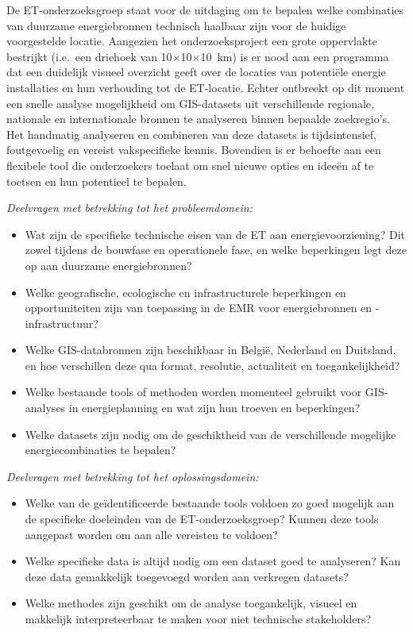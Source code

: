 De ET-onderzoeksgroep staat voor de uitdaging om te bepalen welke combinaties van duurzame energiebronnen technisch haalbaar zijn voor de huidige voorgestelde locatie. Aangezien het onderzoeksproject een grote oppervlakte bestrijkt (i.e.\ een driehoek van 10$\times$10$\times$10~km) is er nood aan een programma dat een duidelijk visueel overzicht geeft over de locaties van potentiële energie installaties en hun verhouding tot de ET-locatie. Echter ontbreekt op dit moment een snelle analyse mogelijkheid om GIS-datasets uit verschillende regionale, nationale en internationale bronnen te analyseren binnen bepaalde zoekregio's. Het handmatig analyseren en combineren van deze datasets is tijdsintensief, foutgevoelig en vereist vakspecifieke kennis. Bovendien is er behoefte aan een flexibele tool die onderzoekers toelaat om snel nieuwe opties en ideeën af te toetsen en hun potentieel te bepalen.\medskip

\textit{Deelvragen met betrekking tot het probleemdomein:}
\begin{itemize}
    \item Wat zijn de specifieke technische eisen van de ET aan energievoorziening? Dit zowel tijdens de bouwfase en operationele fase, en welke beperkingen legt deze op aan duurzame energiebronnen?
    \item Welke geografische, ecologische en infrastructurele beperkingen en opportuniteiten zijn van toepassing in de EMR voor energiebronnen en -infrastructuur?
    \item Welke GIS-databronnen zijn beschikbaar in België, Nederland en Duitsland, en hoe verschillen deze qua format, resolutie, actualiteit en toegankelijkheid?
    \item Welke bestaande tools of methoden worden momenteel gebruikt voor GIS-analyses in energieplanning en wat zijn hun troeven en beperkingen?
    \item Welke datasets zijn nodig om de geschiktheid van de verschillende mogelijke energiecombinaties te bepalen?
\end{itemize}

\textit{Deelvragen met betrekking tot het oplossingsdomein:}
\begin{itemize}
    \item Welke van de geïdentificeerde bestaande tools voldoen zo goed mogelijk aan de specifieke doeleinden van de ET-onderzoeksgroep? Kunnen deze tools aangepast worden om aan alle vereisten te voldoen?
    \item Welke specifieke data is altijd nodig om een dataset goed te analyseren? Kan deze data gemakkelijk toegevoegd worden aan verkregen datasets?
    \item Welke methodes zijn geschikt om de analyse toegankelijk, visueel en makkelijk interpreteerbaar te maken voor niet technische stakeholders?
\end{itemize}

